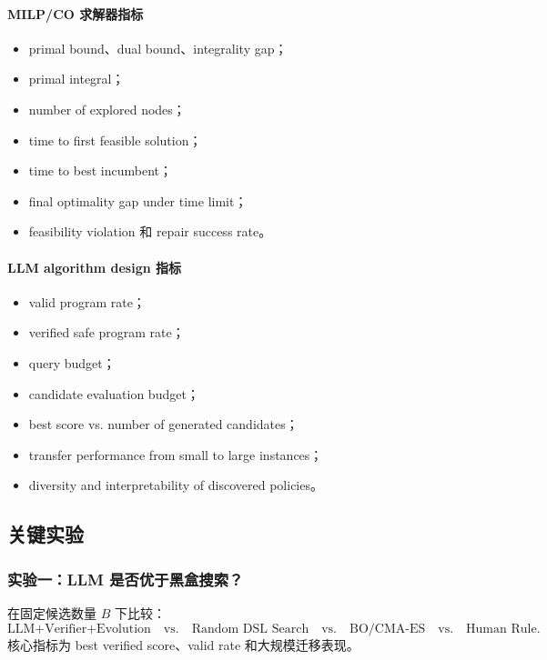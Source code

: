 \documentclass[UTF8,a4paper,12pt,fontset=fandol]{ctexart}
\begin{document}
\paragraph{MILP/CO 求解器指标}
\begin{itemize}[leftmargin=2em]
    \item primal bound、dual bound、integrality gap；
    \item primal integral；
    \item number of explored nodes；
    \item time to first feasible solution；
    \item time to best incumbent；
    \item final optimality gap under time limit；
    \item feasibility violation 和 repair success rate。
\end{itemize}

\paragraph{LLM algorithm design 指标}
\begin{itemize}[leftmargin=2em]
    \item valid program rate；
    \item verified safe program rate；
    \item query budget；
    \item candidate evaluation budget；
    \item best score vs. number of generated candidates；
    \item transfer performance from small to large instances；
    \item diversity and interpretability of discovered policies。
\end{itemize}

\subsection{关键实验}

\subsubsection{实验一：LLM 是否优于黑盒搜索？}

在固定候选数量 $B$ 下比较：
\begin{equation}
\text{LLM+Verifier+Evolution}
\quad \text{vs.} \quad
\text{Random DSL Search}
\quad \text{vs.} \quad
\text{BO/CMA-ES}
\quad \text{vs.} \quad
\text{Human Rule}.
\end{equation}
核心指标为 best verified score、valid rate 和大规模迁移表现。
\end{document}
